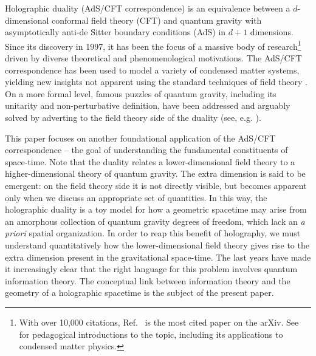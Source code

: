 \documentclass[12pt]{article}
\begin{document}
Holographic duality (AdS/CFT correspondence) \cite{adscft, witten98} is an equivalence between a $d$-dimensional conformal field theory (CFT) and quantum gravity with asymptotically anti-de Sitter boundary conditions (AdS) in $d+1$ dimensions. Since its discovery in 1997, it has been the focus of a massive body of research\footnote{With over 10,000 citations, Ref.~\cite{adscft} is the most cited paper on the arXiv. See \cite{maldacena2003tasi,hartnoll2009lectures} for pedagogical introductions to the topic, including its applications to condensed matter physics.} driven by diverse theoretical and phenomenological motivations. The AdS/CFT correspondence has been used to model a variety of condensed matter systems, yielding new insights not apparent using the standard techniques of field theory \cite{2005PhRvL..94k1601K,2007PhRvD..75h5020H}. On a more formal level, famous puzzles of quantum gravity, including its unitarity and non-perturbative definition, have been addressed and arguably solved by adverting to the field theory side of the duality (see, e.g. \cite{myreview, tedsessay}).

This paper focuses on another foundational application of the AdS/CFT correspondence -- the goal of understanding the fundamental constituents of space-time. Note that the duality relates a lower-dimensional field theory to a higher-dimensional theory of quantum gravity. The extra dimension is said to be emergent: on the field theory side it is not directly visible, but becomes apparent only when we discuss an appropriate set of quantities. In this way, the holographic duality is a toy model for how a geometric spacetime may arise from an amorphous collection of quantum gravity degrees of freedom, which lack an {\it a priori} spatial organization. In order to reap this benefit of holography, we must understand quantitatively how the lower-dimensional field theory gives rise to the extra dimension present in the gravitational space-time. The last years have made it increasingly clear that the right language for this problem involves quantum information theory. The conceptual link between information theory and the geometry of a holographic spacetime is the subject of the present paper.
\end{document}
